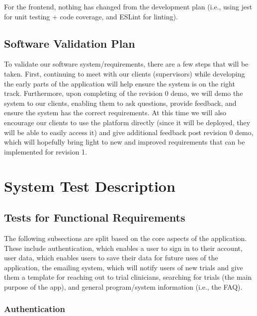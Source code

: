 \documentclass[12pt, titlepage]{article}
\begin{document}
For the frontend, nothing has changed from the development plan (i.e., using jest for unit testing + code coverage, and ESLint for linting).

\subsection{Software Validation Plan}

To validate our software system/requirements, there are a few steps that will be taken. First, continuing to meet with our clients (supervisors) while developing
the early parts of the application will help ensure the system is on the right track. Furthermore, upon completing of the revision 0 demo, we will
demo the system to our clients, enabling them to ask questions, provide feedback, and ensure the system has the correct requirements. At this
time we will also encourage our clients to use the platform directly (since it will be deployed, they will be able to easily access it) and give additional feedback post revision 0 demo,
which will hopefully bring light to new and improved requirements that can be implemented for revision 1. 

\section{System Test Description}
	
\subsection{Tests for Functional Requirements}

The following subsections are split based on the core aspects of the application. These include authentication, which enables a user 
to sign in to their account, user data, which enables users to save their data for future uses of the application, the emailing system, which will
notify users of new trials and give them a template for reaching out to trial clinicians, searching for trials (the main purpose of the app), and 
general program/system information (i.e., the FAQ).

\subsubsection{Authentication}
\end{document}
